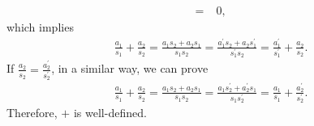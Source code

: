 \begin{solution}
\begin{itemize}
\begin{align*}
            =&\;0,
        \end{align*}
        which implies
        \begin{align*}
            \frac{a_1}{s_1}+\frac{a_2}{s_2}=\frac{a_1s_2+a_2s_1}{s_1s_2}= \frac{a_1^\prime s_2+a_2s_1^\prime}{s_1^\prime s_2}=\frac{a_1^\prime}{s_1^\prime}+\frac{a_2}{s_2}.
        \end{align*}
        If $\frac{a_2}{s_2} = \frac{a_2^\prime}{s_2^\prime}$, in a similar way, we can prove
        \begin{align*}
            \frac{a_1}{s_1}+\frac{a_2}{s_2}=\frac{a_1s_2+a_2s_1}{s_1s_2}= \frac{a_1s_2^\prime+a_2^\prime s_1}{s_1s_2^\prime}=\frac{a_1}{s_1}+\frac{a_2^\prime}{s_2^\prime}.
        \end{align*}
        Therefore, $+$ is well-defined.


\end{itemize}
\end{solution}
